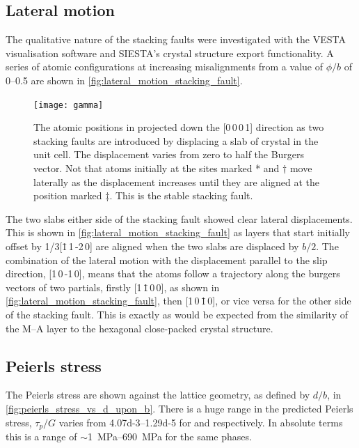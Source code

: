 \subsection{Lateral motion}



The qualitative nature of the stacking faults were investigated with the VESTA visualisation software and SIESTA's crystal structure export functionality. A series of atomic configurations at increasing misalignments from a value of $\phi/b$ of \numrange{0}{0.5} are shown in \autoref{fig:lateral_motion_stacking_fault}.


\begin{figure}[!ht]
\centering
\texttt{[image: gamma]}
\caption{The atomic positions in  projected down the [0\,0\,0\,1] direction as two stacking faults are introduced by displacing a slab of crystal in the unit cell. The displacement varies from zero to half the Burgers vector. Not that atoms initially at the sites marked * and $\dagger$ move laterally as the displacement increases until they are aligned at the position marked $\ddagger$. This is the stable stacking fault. \label{fig:lateral_motion_stacking_fault}}
\end{figure}




 The two slabs either side of the stacking fault showed clear lateral displacements. This is shown in \autoref{fig:lateral_motion_stacking_fault} as layers that start initially  offset by 1/3[\={1}\,1\,-2\,0] are aligned when the two slabs are displaced by $b/2$. The combination of the lateral motion with the displacement parallel to the slip direction, [1\,0\,-1\,0], means that the atoms follow a trajectory along the burgers vectors of two partials, 
 firstly [1\,\={1}\,0\,0], as shown in \autoref{fig:lateral_motion_stacking_fault}, then [1\,0\,\={1}\,0], or vice versa for the other side of the stacking fault. This is exactly as would be expected from the similarity of the M--A layer to the hexagonal close-packed crystal structure.

\subsection{Peierls stress}




The Peierls stress are shown against the lattice geometry, as defined by 
$d/b$, in \autoref{fig:peierls_stress_vs_d_upon_b}. 
There is a huge range in the predicted Peierls stress, 
$\tau_p / G$ varies from 
\numrange{4.07d-3}{1.29d-5} for 
 and 
 respectively. In absolute terms this is a range of 
$\sim$\SIrange{1}{690}{\mega\pascal} for the same phases.

